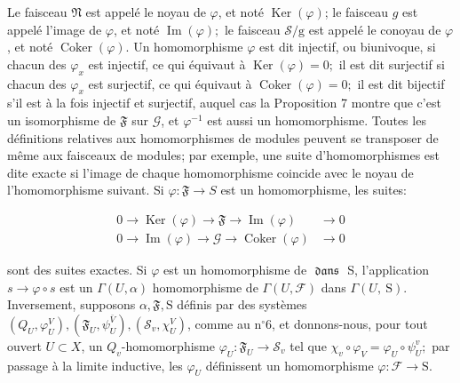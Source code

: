 Le faisceau $\mathfrak{N}$ est appelé le noyau de $\varphi$, et noté $\operatorname{Ker}(\varphi)$; le faisceau $g$ est appelé l'image de $\varphi$, et noté $\operatorname{Im}(\varphi) ;$ le faisceau $\mathcal{S} / \mathrm{g}$ est appelé le conoyau de $\varphi$, et noté $\operatorname{Coker}(\varphi)$. Un homomorphisme $\varphi$ est dit injectif, ou biunivoque, si chacun des $\varphi_{x}$ est injectif, ce qui équivaut à $\operatorname{Ker}(\varphi)=0 ;$ il est dit surjectif si chacun des $\varphi_{x}$ est surjectif, ce qui équivaut à $\operatorname{Coker}(\varphi)=0 ;$ il est dit bijectif s'il est à la fois injectif et surjectif, auquel cas la Proposition 7 montre que c'est un isomorphisme de $\mathfrak{F}$ sur $\mathcal{G}$, et $\varphi^{-1}$ est aussi un homomorphisme. Toutes les définitions relatives aux homomorphismes de modules peuvent se transposer de même aux faisceaux de modules; par exemple, une suite d'homomorphismes est dite exacte si l'image de chaque homomorphisme coincide avec le noyau de l'homomorphisme suivant. Si $\varphi: \mathfrak{F} \rightarrow S$ est un homomorphisme, les suites:

$$
\begin{array}{ll}
    0 \rightarrow \operatorname{Ker}(\varphi) \rightarrow \mathfrak{F} \rightarrow \operatorname{Im}(\varphi) & \rightarrow 0 \\
    0 \rightarrow \operatorname{Im}(\varphi) \rightarrow \mathcal{G} \rightarrow \operatorname{Coker}(\varphi) & \rightarrow 0
\end{array}
$$

sont des suites exactes. Si $\varphi$ est un homomorphisme de $\mathfrak{\text { dans }}$ S, l'application $s \rightarrow \varphi \circ s$ est un $\Gamma(U, \alpha)$ homomorphisme de $\Gamma(U, \mathcal{F})$ dans $\Gamma(U, \mathrm{~S}) .$ Inversement, supposons $\alpha, \mathfrak{F}, \mathrm{S}$ définis par des systèmes $\left(Q_{U}, \varphi_{U}^{V}\right),\left(\mathfrak{F}_{U}, \psi_{U}^{\bar{V}}\right),\left(\mathcal{S}_{v}, \chi_{U}^{V}\right)$, comme au $\mathrm{n}^{\circ} 6$, et donnons-nous, pour tout ouvert $U \subset X$, un $Q_{v}$-homomorphisme $\varphi_{U}: \mathfrak{F}_{U} \rightarrow \mathcal{S}_{v}$ tel que $\chi_{v} \circ \varphi_{V}=\varphi_{U} \circ \psi_{U}^{v} ;$ par passage à la limite inductive, les $\varphi_{U}$ définissent un homomorphisme $\varphi: \mathscr{F} \rightarrow \mathrm{S}$.

